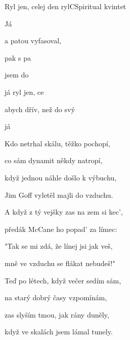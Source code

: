 \begin{song}{Ryl jen, celej den ryl}{C}{Spiritual kvintet}
\begin{SBVerse}
Já 

a patou vyfasoval,

pak s pa

jsem do
\end{SBVerse}
\begin{SBChorus}
  já ryl jen, ce

abych dřív, než do svý 

  

já 


\Ch{$|$:}{}     \Ch{:$|$}{}

\end{SBChorus}
\begin{SBVerse}
Kdo netrhal skálu, těžko pochopí,

co sám dynamit někdy natropí,

když jednou náhle došlo k výbuchu,

Jim Goff vyletěl majli do vzduchu.
\end{SBVerse}
\begin{SBVerse}
A když z tý vejšky zas na zem si kec',

předák McCane ho popad' za límec:

"Tak se mi zdá, že línej jsi jak veš,

mně ve vzduchu se flákat nebudeš!"
\end{SBVerse}
\begin{SBVerse}
Teď po létech, když večer sedím sám,

na starý dobrý časy vzpomínám,

zas slyším tmou, jak rány duněly,

když ve skalách jsem lámal tunely.
\end{SBVerse}
\end{song}

\pagebreak
